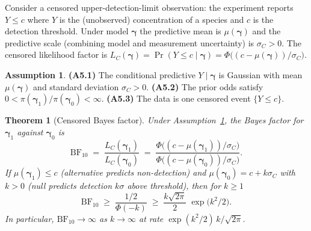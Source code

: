 \documentclass[12pt]{article}
\theoremstyle{plain}
\newtheorem{theorem}{Theorem}
\theoremstyle{definition}
\newtheorem{assumption}{Assumption}
\theoremstyle{remark}
\begin{document}
Consider a censored upper-detection-limit observation: the experiment
reports $Y\le c$ where $Y$ is the (unobserved) concentration of a
species and $c$ is the detection threshold.  Under model
$\boldsymbol\gamma$ the predictive mean is $\mu(\boldsymbol\gamma)$
and the predictive scale (combining model and measurement uncertainty)
is $\sigma_C>0$.  The censored likelihood factor is
$L_C(\boldsymbol\gamma)=\Pr(Y\le c\mid\boldsymbol\gamma)
=\Phi\bigl((c-\mu(\boldsymbol\gamma))/\sigma_C\bigr)$.

\begin{assumption}\label{ass:thm5}
\textbf{(A5.1)} The conditional predictive $Y\mid\boldsymbol\gamma$ is
Gaussian with mean $\mu(\boldsymbol\gamma)$ and standard deviation
$\sigma_C>0$.
\textbf{(A5.2)} The prior odds satisfy
$0<\pi(\boldsymbol\gamma_1)/\pi(\boldsymbol\gamma_0)<\infty$.
\textbf{(A5.3)} The data is one censored event $\{Y\le c\}$.
\end{assumption}

\begin{theorem}[Censored Bayes factor]\label{thm:censored}
Under Assumption~\ref{ass:thm5}, the Bayes factor for
$\boldsymbol\gamma_1$ against $\boldsymbol\gamma_0$ is
\begin{equation}\label{eq:BF_form}
  \mathrm{BF}_{10}
   \;=\;\frac{L_C(\boldsymbol\gamma_1)}{L_C(\boldsymbol\gamma_0)}
   \;=\;\frac{\Phi\bigl((c-\mu(\boldsymbol\gamma_1))/\sigma_C\bigr)}
              {\Phi\bigl((c-\mu(\boldsymbol\gamma_0))/\sigma_C\bigr)}.
\end{equation}
If $\mu(\boldsymbol\gamma_1)\le c$ (alternative predicts non-detection)
and $\mu(\boldsymbol\gamma_0)=c+k\sigma_C$ with $k>0$ (null predicts
detection $k\sigma$ above threshold), then for $k\ge 1$
\begin{equation}\label{eq:BF_bound}
   \mathrm{BF}_{10}
   \;\ge\;\frac{1/2}{\Phi(-k)}
   \;\ge\;\frac{k\sqrt{2\pi}}{2}\;\exp\!\bigl(k^2/2\bigr).
\end{equation}
In particular, $\mathrm{BF}_{10}\to\infty$ as $k\to\infty$ at rate
$\exp(k^2/2)\,k/\sqrt{2\pi}$.
\end{theorem}
\end{document}
